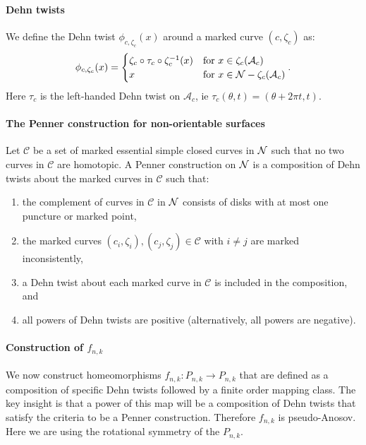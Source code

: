 \paragraph{Dehn twists} We define the Dehn twist $\phi_{c,\zeta_c}(x)$ around a marked curve $(c,\zeta_c)$ as:
\begin{align*}
  \phi_{c,\zeta_c}(x) =
  \begin{cases}
    \zeta_c \circ \tau_c \circ \zeta_c^{-1}(x) & \text{for } x \in \zeta_c(\mathcal{A}_c) \\
    x & \text{for } x \in \mathcal{N} - \zeta_c(\mathcal{A}_c)
  \end{cases}.
\end{align*}
Here $\tau_c$ is the left-handed Dehn twist on $\mathcal{A}_c$, ie $\tau_c(\theta,t) = (\theta + 2\pi t,t)$.

\paragraph{The Penner construction for non-orientable surfaces} Let $\mathcal{C}$ be a set of marked essential simple closed curves in $\mathcal{N}$ such that no two curves in $\mathcal{C}$ are homotopic.  A Penner construction on $\mathcal{N}$ is a composition of Dehn twists about the marked curves in $\mathcal{C}$ such that:
\begin{enumerate}
\item the complement of curves in $\mathcal{C}$ in $\mathcal{N}$ consists of disks with at most one puncture or marked point,
    \item the marked curves $(c_i,\zeta_i),(c_j,\zeta_j)\in\mathcal{C}$ with $i\neq j$ are marked inconsistently,
    \item a Dehn twist about each marked curve in $\mathcal{C}$ is included in the composition, and
    \item all powers of Dehn twists are positive (alternatively, all powers are negative).
\end{enumerate}



\paragraph{Construction of $f_{n,k}$} We now construct homeomorphisms $f_{n,k}: P_{n,k} \to P_{n,k}$ that are defined as a composition of specific Dehn twists
followed by a finite order mapping class. The key insight is that a power of this map will be a composition of
Dehn twists that satisfy the criteria to be a Penner construction.  Therefore $f_{n,k}$ is pseudo-Anosov. Here we are using the rotational symmetry of the $P_{n,k}$.

